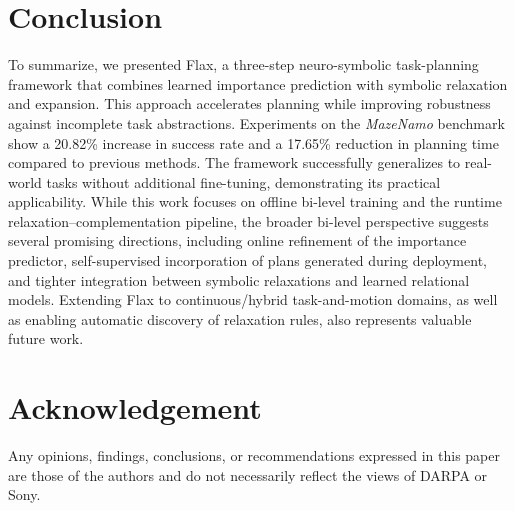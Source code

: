 \documentclass[letterpaper, 10pt, journal, twoside]{IEEEtran}
\newcommand{\shortname}{Flax\xspace}
\begin{document}
\section{Conclusion}
To summarize, we presented \shortname, a three-step neuro-symbolic task-planning framework that combines learned importance prediction with symbolic relaxation and expansion. This approach accelerates planning while improving robustness against incomplete task abstractions. Experiments on the \textit{MazeNamo} benchmark show a 20.82\% increase in success rate and a 17.65\% reduction in planning time compared to previous methods. The framework successfully generalizes to real-world tasks without additional fine-tuning, demonstrating its practical applicability. 
While this work focuses on offline bi-level training and the runtime relaxation–complementation pipeline, the broader bi-level perspective suggests several promising directions, including online refinement of the importance predictor, self-supervised incorporation of plans generated during deployment, and tighter integration between symbolic relaxations and learned relational models. Extending \shortname to continuous/hybrid task-and-motion domains, as well as enabling automatic discovery of relaxation rules, also represents valuable future work.






\section*{Acknowledgement}


Any opinions, findings, conclusions, or recommendations expressed in this paper are those of the authors and do not necessarily reflect the views of DARPA or Sony.





\end{document}

